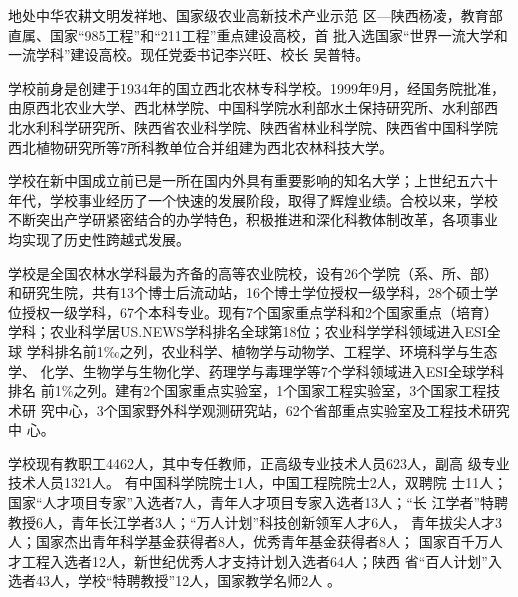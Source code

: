 \documentclass{ctexart}
\begin{document}
地处中华农耕文明发祥地、国家级农业高新技术产业示范
区---陕西杨凌，教育部直属、国家“985工程”和“211工程”重点建设高校，首
批入选国家“世界一流大学和一流学科”建设高校。现任党委书记李兴旺、校长
吴普特。

学校前身是创建于1934年的国立西北农林专科学校。1999年9月，经国务院批准，
由原西北农业大学、西北林学院、中国科学院水利部水土保持研究所、水利部西
北水利科学研究所、陕西省农业科学院、陕西省林业科学院、陕西省中国科学院
西北植物研究所等7所科教单位合并组建为西北农林科技大学。


学校在新中国成立前已是一所在国内外具有重要影响的知名大学；上世纪五六十
年代，学校事业经历了一个快速的发展阶段，取得了辉煌业绩。合校以来，学校
不断突出产学研紧密结合的办学特色，积极推进和深化科教体制改革，各项事业
均实现了历史性跨越式发展。

学校是全国农林水学科最为齐备的高等农业院校，设有26个学院（系、所、部）
和研究生院，共有13个博士后流动站，16个博士学位授权一级学科，28个硕士学
位授权一级学科，67个本科专业。现有7个国家重点学科和2个国家重点（培育）
学科；农业科学居US.NEWS学科排名全球第18位；农业科学学科领域进入ESI全球
学科排名前1‰之列，农业科学、植物学与动物学、工程学、环境科学与生态学、
化学、生物学与生物化学、药理学与毒理学等7个学科领域进入ESI全球学科排名
前1\%之列。建有2个国家重点实验室，1个国家工程实验室，3个国家工程技术研
究中心，3个国家野外科学观测研究站，62个省部重点实验室及工程技术研究中
心。

学校现有教职工4462人，其中专任教师，正高级专业技术人员623人，副高
级专业技术人员1321人。 有中国科学院院士1人，中国工程院院士2人，双聘院
士11人；国家“人才项目专家”入选者7人，青年人才项目专家入选者13人；“长
江学者”特聘教授6人，青年长江学者3人；“万人计划”科技创新领军人才6人，
青年拔尖人才3人；国家杰出青年科学基金获得者8人，优秀青年基金获得者8人；
国家百千万人才工程入选者12人，新世纪优秀人才支持计划入选者64人；陕西
省“百人计划”入选者43人，学校“特聘教授”12人，国家教学名师2人
。
\end{document}
